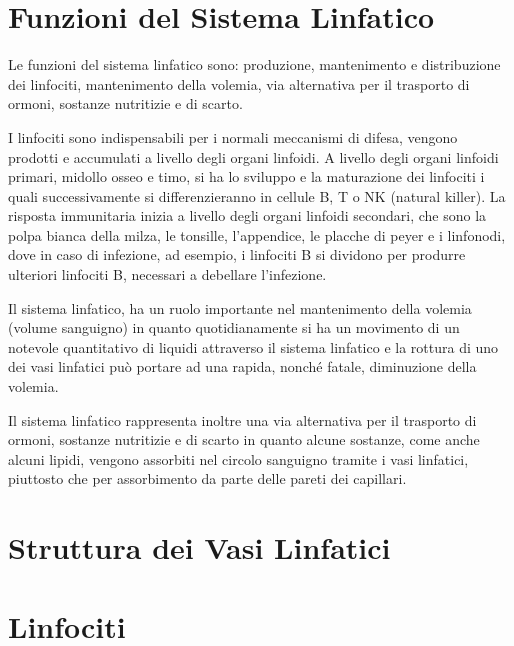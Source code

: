 \section{Funzioni del Sistema Linfatico}
Le funzioni del sistema linfatico sono: produzione, mantenimento e distribuzione dei linfociti, 
mantenimento della volemia, via alternativa per il trasporto di ormoni, sostanze nutritizie e di scarto.


I linfociti sono indispensabili per i normali meccanismi di difesa, vengono prodotti e accumulati a livello degli organi linfoidi. 
A livello degli organi linfoidi primari, midollo osseo e timo, si ha lo sviluppo e la maturazione dei linfociti i quali successivamente
si differenzieranno in cellule B, T o NK (natural killer). 
La risposta immunitaria inizia a livello degli organi linfoidi secondari, che sono la polpa bianca della milza,
le tonsille, l'appendice, le placche di peyer e i linfonodi, dove in caso di infezione, ad esempio, i linfociti B
si dividono per produrre ulteriori linfociti B, necessari a debellare l'infezione.

Il sistema linfatico, ha un ruolo importante nel mantenimento della volemia (volume sanguigno) in quanto 
quotidianamente si ha un movimento di un notevole quantitativo di liquidi attraverso il sistema linfatico e la rottura 
di uno dei vasi linfatici può portare ad una rapida, nonché fatale, diminuzione della volemia.

Il sistema linfatico rappresenta inoltre una via alternativa per il trasporto di ormoni, 
sostanze nutritizie e di scarto in quanto alcune sostanze, come anche alcuni lipidi, vengono assorbiti
nel circolo sanguigno tramite i vasi linfatici, piuttosto che per assorbimento da parte delle pareti dei capillari.

\section{Struttura dei Vasi Linfatici}
\section{Linfociti}